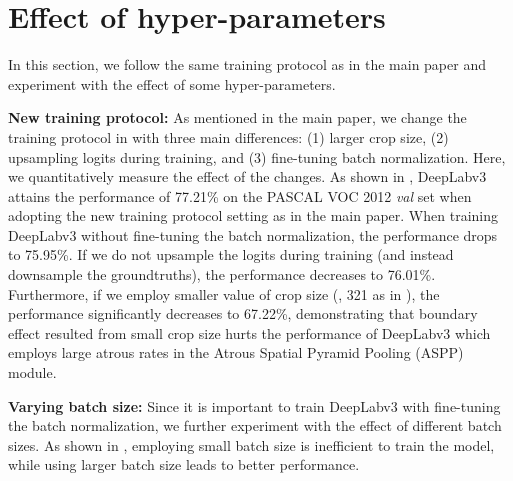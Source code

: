 \appendix
\section{Effect of hyper-parameters}
In this section, we follow the same training protocol as in the main paper and experiment with the effect of some hyper-parameters.

\textbf{New training protocol:} As mentioned in the main paper, we change the training protocol in \cite{chen2014semantic, chen2016deeplab} with three main differences: (1) larger crop size, (2) upsampling logits during training, and (3) fine-tuning batch normalization. Here, we quantitatively measure the effect of the changes. As shown in , DeepLabv3 attains the performance of 77.21\% on the PASCAL VOC 2012 \textit{val} set \cite{everingham2014pascal} when adopting the new training protocol setting as in the main paper. When training DeepLabv3 without fine-tuning the batch normalization, the performance drops to 75.95\%. If we do not upsample the logits during training (and instead downsample the groundtruths), the performance decreases to 76.01\%. Furthermore, if we employ smaller value of crop size (\ie, 321 as in \cite{chen2014semantic, chen2016deeplab}), the performance significantly decreases to 67.22\%, demonstrating that boundary effect resulted from small crop size hurts the performance of DeepLabv3 which employs large atrous rates in the Atrous Spatial Pyramid Pooling (ASPP) module.

\textbf{Varying batch size:} Since it is important to train DeepLabv3 with fine-tuning the batch normalization, we further experiment with the effect of different batch sizes. As shown in , employing small batch size is inefficient to train the model, while using larger batch size leads to better performance.

